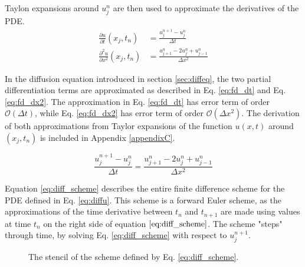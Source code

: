 Taylon expansions around $u_j^n$ are then used to approximate the derivatives of the PDE.
\begin{align}
    \label{eq:fd_dt}
    \frac{\partial u}{\partial t}(x_j, t_n) &= \frac{u_j^{n+1}-u_j^n}{\Delta t} \\
    \label{eq:fd_dx2}
    \frac{\partial^2 u}{\partial x^2}(x_j, t_n) &= \frac{u_{j+1}^n - 2u_j^n + u_{j-1}^n}{\Delta x^2}
\end{align}

In the diffusion equation introduced in section \ref{sec:diffeq}, the two partial differentiation terms are approximated as described in Eq. \ref{eq:fd_dt} and Eq. \ref{eq:fd_dx2}.
The approximation in Eq. \ref{eq:fd_dt} has error term of order $\mathcal{O}(\Delta t)$, while Eq. \ref{eq:fd_dx2} has error term of order $\mathcal{O}(\Delta x^2)$.
The derivation of both approximations from Taylor expansions of the function $u(x, t)$ around $(x_j, t_n)$ is included in Appendix \ref{appendixC}.

\begin{equation}
    \label{eq:diff_scheme}
    \frac{u_j^{n+1}-u_j^n}{\Delta t} = \frac{u_{j+1}^n - 2u_j^n + u_{j-1}^n}{\Delta x^2}
\end{equation}

Equation \ref{eq:diff_scheme} describes the entire finite difference scheme for the PDE defined in Eq. \ref{eq:diffu}.
This scheme is a forward Euler scheme, as the approximations of the time derivative between $t_n$ and $t_{n+1}$ are made using values at time $t_n$ on the right side of equation $\ref{eq:diff_scheme}$.
The scheme "steps" through time, by solving Eq. \ref{eq:diff_scheme} with respect to $u_j^{n+1}$.
\begin{figure}[h]
        \centering
        
        \caption{The stencil of the scheme defined by Eq. \ref{eq:diff_scheme}.} 
        \label{fig:fd_stencil}  
    \end{figure}
    
